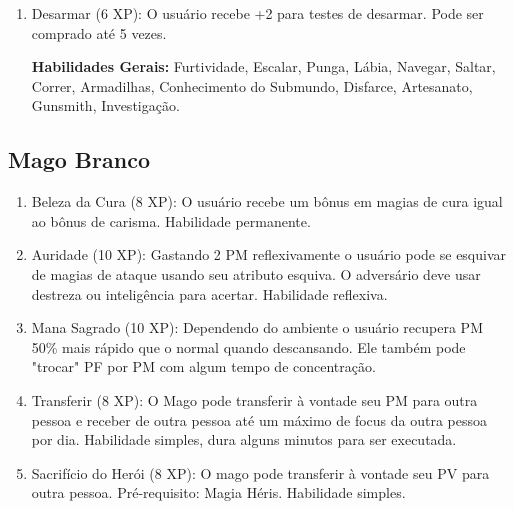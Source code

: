 \begin{enumerate}
 	\item Desarmar (6 XP): O usuário recebe +2 para testes de desarmar. Pode ser comprado até 5 vezes. 	

\textbf{Habilidades Gerais:} Furtividade, Escalar, Punga, Lábia, Navegar, Saltar, Correr, Armadilhas, Conhecimento do Submundo, Disfarce, Artesanato, Gunsmith, Investigação.
 
\end{enumerate}
 
 \subsection{Mago Branco}
 
\begin{enumerate}
	\item Beleza da Cura (8 XP): O usuário recebe um bônus em magias de cura igual ao bônus de carisma. Habilidade permanente.

	\item Auridade (10 XP): Gastando 2 PM reflexivamente o usuário pode se esquivar de magias de ataque usando seu atributo esquiva. O adversário deve usar destreza ou inteligência para acertar. Habilidade reflexiva.
	 
		 
	\item Mana Sagrado (10 XP): Dependendo do ambiente o usuário recupera PM 50\% mais rápido que o normal quando descansando. Ele também pode "trocar" PF por PM com algum tempo de concentração.
 
	\item Transferir (8 XP): O Mago pode transferir à vontade seu PM para outra pessoa e receber de outra pessoa até um máximo de focus da outra pessoa por dia. Habilidade simples, dura alguns minutos para ser executada. 
 
	\item Sacrifício do Herói (8 XP): O mago pode transferir à vontade seu PV para outra pessoa. Pré-requisito: Magia Héris. Habilidade simples.
 	
		

\end{enumerate}
